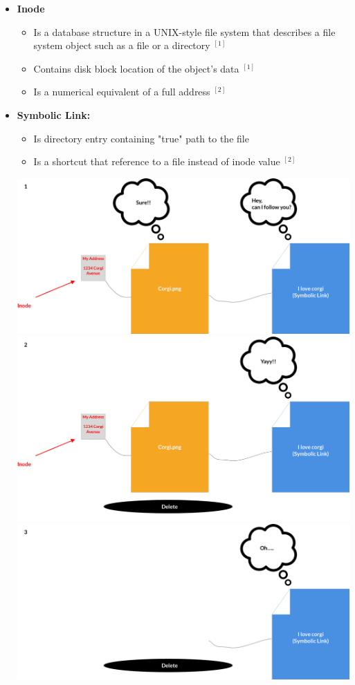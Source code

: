 \documentclass[12pt]{article}
\begin{document}
\begin{itemize}
    \begin{itemize}
        \item \textbf{Inode}
        \begin{itemize}
            \item Is a database structure in a UNIX-style file system that describes
            a file system object such as a file or a directory $^{[1]}$
            \item Contains disk block location of the object's data $^{[1]}$
            \item Is a numerical equivalent of a full address $^{[2]}$
        \end{itemize}
        \item \textbf{Symbolic Link:}
        \begin{itemize}
            \item Is directory entry containing "true" path to the file
            \item Is a shortcut that reference to a file instead of inode value $^{[2]}$
        \end{itemize}

        \begin{center}
            \includegraphics[width=0.8\linewidth]{images/week_8_notes_1_4.png}
            \includegraphics[width=0.8\linewidth]{images/week_8_notes_1_5.png}
            \includegraphics[width=0.8\linewidth]{images/week_8_notes_1_6.png}
        \end{center}


\end{itemize}
\end{itemize}
\end{document}
